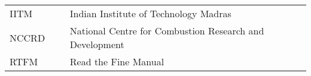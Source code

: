 
\abbreviations
 
\begin{tabular}{p{0.2\linewidth}p{0.8\linewidth}}
	IITM & Indian Institute of Technology Madras \\
	NCCRD & National Centre for Combustion Research and Development \\
	RTFM & Read the Fine Manual \\
\end{tabular}

